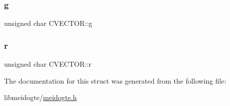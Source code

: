 \subsubsection{\texorpdfstring{g}{g}}
{\footnotesize\ttfamily unsigned char C\+V\+E\+C\+T\+O\+R\+::g}

\mbox{\label{structCVECTOR_a237eff5125e5e4fe378247461b06dcd3}} 
\subsubsection{\texorpdfstring{r}{r}}
{\footnotesize\ttfamily unsigned char C\+V\+E\+C\+T\+O\+R\+::r}



The documentation for this struct was generated from the following file\+:\begin{DoxyCompactItemize}
\item 
libmeidogte/\hyperlink{meidogte_8h}{meidogte.\+h}\end{DoxyCompactItemize}
